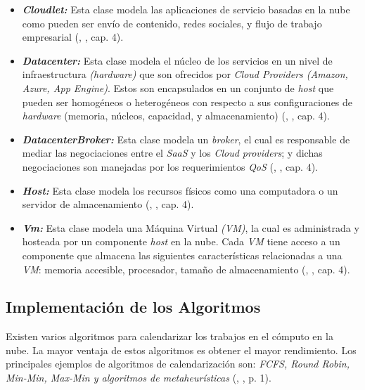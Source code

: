\begin{itemize}
	\item \textit{\textbf{Cloudlet:}} Esta clase modela las aplicaciones de servicio basadas en la nube como pueden ser env\'io de contenido, redes sociales, y flujo de trabajo empresarial (\citeauthor{calheiros2011cloudsim}, \citeyear{calheiros2011cloudsim}, cap. 4).
	\item \textit{ \textbf{Datacenter:}} Esta clase modela el núcleo de los servicios en un nivel de infraestructura \textit{(hardware)} que son ofrecidos por \textit{Cloud Providers (Amazon, Azure, App Engine)}. Estos son encapsulados en un conjunto de \textit{host} que pueden ser homogéneos o heterogéneos con respecto a sus configuraciones de \textit{hardware} (memoria, n\'ucleos, capacidad, y almacenamiento) (\citeauthor{calheiros2011cloudsim}, \citeyear{calheiros2011cloudsim}, cap. 4).
	\item \textit{ \textbf{DatacenterBroker:}} Esta clase modela un \textit{broker}, el cual es responsable de mediar las negociaciones entre el \textit{SaaS} y los \textit{Cloud providers}; y dichas negociaciones son manejadas por los requerimientos \textit{QoS} (\citeauthor{calheiros2011cloudsim}, \citeyear{calheiros2011cloudsim}, cap. 4).
	\item  \textit{\textbf{Host:}} Esta clase modela los recursos f\'isicos como una computadora o un servidor de almacenamiento (\citeauthor{calheiros2011cloudsim}, \citeyear{calheiros2011cloudsim}, cap. 4).
	\item  \textit{\textbf{Vm:}} Esta clase modela una M\'aquina Virtual \textit{(VM)}, la cual es administrada y hosteada por un componente \textit{host} en la nube. Cada \textit{VM} tiene acceso a un componente que almacena las siguientes características relacionadas a una \textit{VM}: memoria accesible, procesador, tamaño de almacenamiento (\citeauthor{calheiros2011cloudsim}, \citeyear{calheiros2011cloudsim}, cap. 4).
\end{itemize}


\newpage

\subsection{Implementaci\'on de los Algoritmos}

Existen varios algoritmos para calendarizar los trabajos en el c\'omputo en la nube. La mayor ventaja de estos algoritmos es obtener el mayor rendimiento. Los principales ejemplos de algoritmos de calendarizaci\'on son: \textit{FCFS, Round Robin, Min-Min, Max-Min y algoritmos de metaheurísticas}  (\citeauthor{shimpy2014different}, \citeyear{shimpy2014different}, p. 1).



